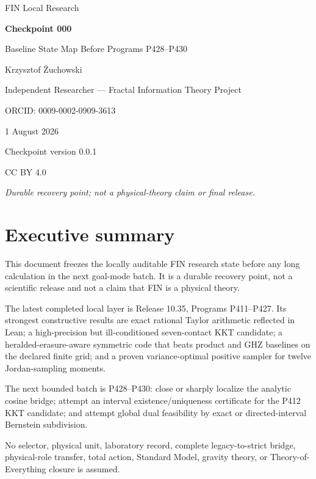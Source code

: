 \documentclass[11pt,a4paper]{article}
\begin{document}
\begin{titlepage}
\centering
{\Large FIN Local Research\par}
\vspace{1cm}
{\Huge\bfseries Checkpoint 000\par}
\vspace{0.4cm}
{\Large Baseline State Map Before Programs P428--P430\par}
\vfill
{\large Krzysztof \.{Z}uchowski\par}
\vspace{0.25cm}
Independent Researcher --- Fractal Information Theory Project\par
ORCID: 0009-0002-0909-3613\par
\vspace{0.7cm}
1 August 2026\par
Checkpoint version 0.0.1\par
CC BY 4.0\par
\vfill
\textit{Durable recovery point; not a physical-theory claim or final release.}
\end{titlepage}

\tableofcontents
\newpage

\section{Executive summary}
This document freezes the locally auditable FIN research state before any long
calculation in the next goal-mode batch. It is a durable recovery point, not a
scientific release and not a claim that FIN is a physical theory.

The latest completed local layer is Release 10.35, Programs P411--P427. Its
strongest constructive results are exact rational Taylor arithmetic reflected
in Lean; a high-precision but ill-conditioned seven-contact KKT candidate; a
heralded-erasure-aware symmetric code that beats product and GHZ baselines on
the declared finite grid; and a proven variance-optimal positive sampler for
twelve Jordan-sampling moments.

The next bounded batch is P428--P430: close or sharply localize the analytic
cosine bridge; attempt an interval existence/uniqueness certificate for the
P412 KKT candidate; and attempt global dual feasibility by exact or
directed-interval Bernstein subdivision.

No selector, physical unit, laboratory record, complete legacy-to-strict
bridge, physical-role transfer, total action, Standard Model, gravity theory,
or Theory-of-Everything closure is assumed.
\end{document}
